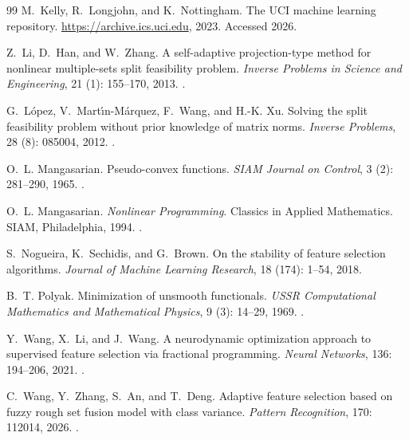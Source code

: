 \documentclass[]{interact}
\theoremstyle{plain}
\theoremstyle{definition}
\theoremstyle{remark}
\begin{document}
\begin{thebibliography}{99}
M.~Kelly, R.~Longjohn, and K.~Nottingham.
\newblock The {UCI} machine learning repository.
\newblock \url{https://archive.ics.uci.edu}, 2023.
\newblock Accessed 2026.

Z.~Li, D.~Han, and W.~Zhang.
\newblock A self-adaptive projection-type method for nonlinear multiple-sets split feasibility problem.
\newblock \emph{Inverse Problems in Science and Engineering}, 21 (1): 155--170, 2013.
\newblock {}.

G.~L{\'o}pez, V.~Mart{\'\i}n-M{\'a}rquez, F.~Wang, and H.-K. Xu.
\newblock Solving the split feasibility problem without prior knowledge of matrix norms.
\newblock \emph{Inverse Problems}, 28 (8): 085004, 2012.
\newblock {}.

O.~L. Mangasarian.
\newblock Pseudo-convex functions.
\newblock \emph{SIAM Journal on Control}, 3 (2): 281--290, 1965.
\newblock {}.

O.~L. Mangasarian.
\newblock \emph{Nonlinear Programming}.
\newblock Classics in Applied Mathematics. SIAM, Philadelphia, 1994.
\newblock {}.

S.~Nogueira, K.~Sechidis, and G.~Brown.
\newblock On the stability of feature selection algorithms.
\newblock \emph{Journal of Machine Learning Research}, 18 (174): 1--54, 2018.

B.~T. Polyak.
\newblock Minimization of unsmooth functionals.
\newblock \emph{USSR Computational Mathematics and Mathematical Physics}, 9 (3): 14--29, 1969.
\newblock {}.

Y.~Wang, X.~Li, and J.~Wang.
\newblock A neurodynamic optimization approach to supervised feature selection via fractional programming.
\newblock \emph{Neural Networks}, 136: 194--206, 2021.
\newblock {}.

C.~Wang, Y.~Zhang, S.~An, and T.~Deng.
\newblock Adaptive feature selection based on fuzzy rough set fusion model with class variance.
\newblock \emph{Pattern Recognition}, 170: 112014, 2026.
\newblock {}.


\end{thebibliography}
\end{document}
